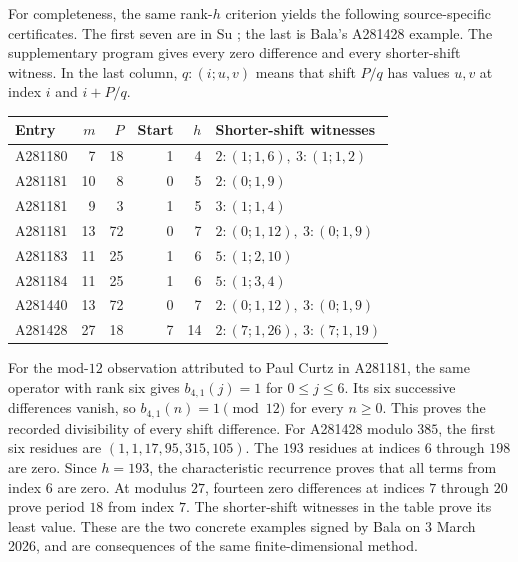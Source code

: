 \documentclass[11pt]{article}
\begin{document}
For completeness, the same rank-$h$ criterion yields the following
source-specific certificates. The first seven are in Su
\cite[Proposition 3.6]{su}; the last is Bala's A281428 example.
The supplementary program gives every zero difference and every shorter-shift
witness. In the last column, $q:(i;u,v)$ means that shift $P/q$ has
values $u,v$ at index $i$ and $i+P/q$.
\begin{center}\small
\begin{tabular}{lrrrrl}
\toprule
Entry & $m$ & $P$ & Start & $h$ & Shorter-shift witnesses\\
\midrule
A281180 & 7 & 18 & 1 & 4 & $2:(1;1,6),\ 3:(1;1,2)$\\
A281181 & 10 & 8 & 0 & 5 & $2:(0;1,9)$\\
A281181 & 9 & 3 & 1 & 5 & $3:(1;1,4)$\\
A281181 & 13 & 72 & 0 & 7 & $2:(0;1,12),\ 3:(0;1,9)$\\
A281183 & 11 & 25 & 1 & 6 & $5:(1;2,10)$\\
A281184 & 11 & 25 & 1 & 6 & $5:(1;3,4)$\\
A281440 & 13 & 72 & 0 & 7 & $2:(0;1,12),\ 3:(0;1,9)$\\
A281428 & 27 & 18 & 7 & 14 & $2:(7;1,26),\ 3:(7;1,19)$\\
\bottomrule
\end{tabular}
\end{center}
For the mod-$12$ observation attributed to Paul Curtz in A281181, the same
operator with rank six gives $b_{4,1}(j)=1$ for $0\le j\le6$.
Its six successive differences vanish, so $b_{4,1}(n)=1\pmod{12}$ for
every $n\ge0$. This proves the recorded divisibility of every shift difference.
For A281428 modulo $385$, the first six residues are
$(1,1,17,95,315,105)$. The $193$ residues at indices $6$ through $198$
are zero. Since $h=193$, the characteristic recurrence proves that all
terms from index $6$ are zero. At modulus $27$, fourteen zero differences
at indices $7$ through $20$ prove period $18$ from index $7$.
The shorter-shift witnesses in the table prove its least value.
These are the two concrete examples signed by Bala on 3 March 2026,
and are consequences of the same finite-dimensional method.
\end{document}
